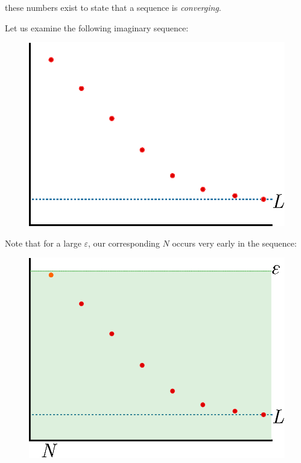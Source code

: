   these numbers exist to state that a sequence is \emph{converging}.
\begin{ex}
  Let us examine the following imaginary sequence:
  \begin{figure}[H]
    \begin{center}
      \includegraphics[scale=0.5]{continuous/sequence/conv1.eps}
    \end{center}
    \label{fig:conv1}
  \end{figure}
  Note that for a large $\varepsilon$, our corresponding $N$ occurs very early in the sequence:
  \begin{figure}[H]
    \begin{center}
      \includegraphics[scale=0.5]{continuous/sequence/conv2.eps}

\end{center}
\end{figure}
\end{ex}
